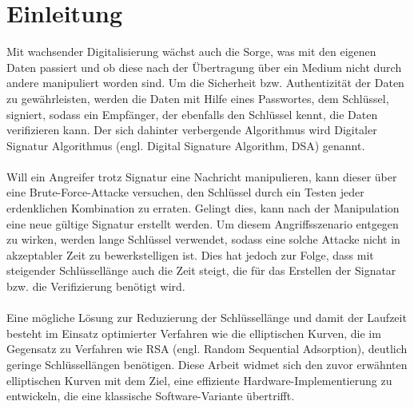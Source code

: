 \chapter{Einleitung}
Mit wachsender Digitalisierung wächst auch die Sorge, was mit den eigenen Daten passiert und ob diese nach der Übertragung über ein Medium nicht durch andere manipuliert worden sind. Um die Sicherheit bzw. Authentizität der Daten zu gewährleisten, werden die Daten mit Hilfe eines Passwortes, dem Schlüssel, signiert, sodass ein Empfänger, der ebenfalls den Schlüssel kennt, die Daten verifizieren kann. Der sich dahinter verbergende Algorithmus wird Digitaler Signatur Algorithmus (engl. Digital Signature Algorithm, DSA) genannt.
\\ \\
Will ein Angreifer trotz Signatur eine Nachricht manipulieren, kann dieser über eine Brute-Force-Attacke versuchen, den Schlüssel durch ein Testen jeder erdenklichen Kombination zu erraten. Gelingt dies, kann nach der Manipulation eine neue gültige Signatur erstellt werden. Um diesem Angriffsszenario entgegen zu wirken, werden lange Schlüssel verwendet, sodass eine solche Attacke nicht in akzeptabler Zeit zu bewerkstelligen ist. Dies hat jedoch zur Folge, dass mit steigender Schlüssellänge auch die Zeit steigt, die für das Erstellen der Signatar bzw. die Verifizierung benötigt wird. 
\\ \\
Eine mögliche Lösung zur Reduzierung der Schlüssellänge und damit der Laufzeit besteht im Einsatz optimierter Verfahren wie die elliptischen Kurven, die im Gegensatz zu Verfahren wie RSA (engl. Random Sequential Adsorption), deutlich geringe Schlüssellängen benötigen. Diese Arbeit widmet sich den zuvor erwähnten elliptischen Kurven mit dem Ziel, eine effiziente Hardware-Implementierung zu entwickeln, die eine klassische Software-Variante übertrifft.
